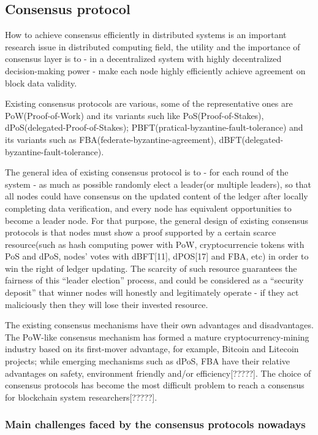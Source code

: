 \documentclass[doublespacing]{bmcart}
\begin{document}
\begin{CJK*}{UTF8}{gbsn}
\subsection{\textbf{Consensus protocol}}
	How to achieve consensus efficiently in distributed systems is an important research issue in distributed computing field, the utility and the importance of consensus layer is to - in a decentralized system with highly decentralized decision-making power - make each node highly efficiently achieve agreement on block data validity.

	Existing consensus protocols are various, some of the representative ones are PoW(Proof-of-Work) and its variants such like PoS(Proof-of-Stakes), dPoS(delegated-Proof-of-Stakes); PBFT(pratical-byzantine-fault-tolerance) and its variants such as FBA(federate-byzantine-agreement), dBFT(delegated-byzantine-fault-tolerance). 
	
	  The general idea of existing consensus protocol is to - for each round of the system - as much as possible randomly elect a leader(or multiple leaders), so that all nodes could have consensus on the updated content of the ledger after locally completing data verification, and every node has equivalent opportunities to become a leader node. For that purpose, the general design of existing consensus protocols is that nodes must show a proof supported by a certain scarce resource(such as hash computing power with PoW, cryptocurrencie tokens with PoS and dPoS, nodes' votes with dBFT[11], dPOS[17] and FBA, etc) in order to win the right of ledger updating. The scarcity of such resource guarantees the fairness of this ``leader election'' process, and could be considered as a ``security deposit'' that winner nodes will honestly and legitimately operate - if they act maliciously then they will lose their invested resource.
	
	The existing consensus mechanisms have their own advantages and disadvantages. The PoW-like consensus mechanism has formed a mature cryptocurrency-mining industry based on its first-mover advantage, for example, Bitcoin and Litecoin projects; while emerging mechanisms such as dPoS, FBA have their relative advantages on safety, environment friendly and/or efficiency[?????]. The choice of consensus protocols has become the most difficult problem to reach a consensus for blockchain system researchers[?????].
\subsubsection{\textbf{Main challenges faced by the consensus protocols nowadays}}
\begin{description}


\end{description}
\end{CJK*}
\end{document}
